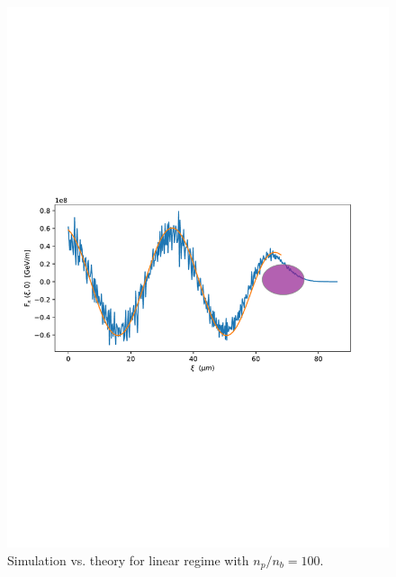 \begin{figure}
\includegraphics[width=\textwidth]{linear_SimVsTheory_bunch.pdf}
\caption{Simulation vs. theory for linear regime with $n_p/n_b=100$. }
\label{theory_vs_simulation}
\end{figure}
